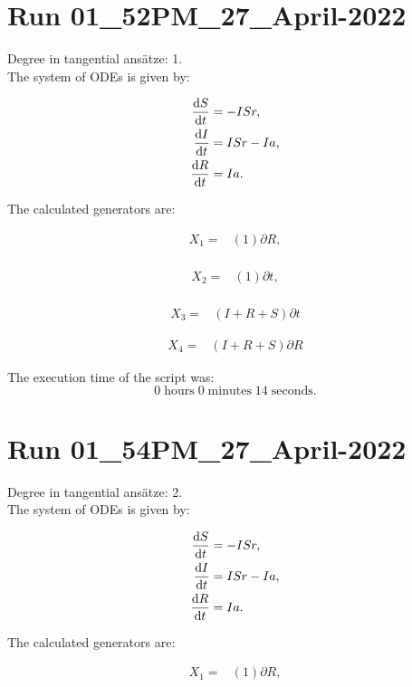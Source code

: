 \section*{Run 01\_52PM\_27\_April-2022}
Degree in tangential ansätze:	1.\\
The system of ODEs is given by:

\begin{align*}
\dv{S}{t}&=- I S r,\\
\dv{I}{t}&=I S r - I a,\\
\dv{R}{t}&=I a.\\
\end{align*}

\noindent The calculated generators are:

\begin{align*}
X_{1}=&\left(1 \right)\partial R,\\
\end{align*}

\begin{align*}
X_{2}=&\left(1 \right)\partial t,\\
\end{align*}

\begin{align*}
X_{3}=&\left(I+R+S \right)\partial t
\end{align*}

\begin{align*}
X_{4}=&\left(I+R+S \right)\partial R
\end{align*}

\noindent The execution time of the script was:
$$0\;\mathrm{hours}\;0\;\mathrm{minutes}\;14 \;\mathrm{seconds}.$$
\section*{Run 01\_54PM\_27\_April-2022}
Degree in tangential ansätze:	2.\\
The system of ODEs is given by:

\begin{align*}
\dv{S}{t}&=- I S r,\\
\dv{I}{t}&=I S r - I a,\\
\dv{R}{t}&=I a.\\
\end{align*}

\noindent The calculated generators are:

\begin{align*}
X_{1}=&\left(1 \right)\partial R,\\
\end{align*}

